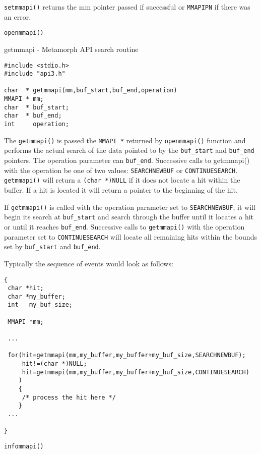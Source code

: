 \DIAGNOSTICS
\verb`setmmapi()` returns the mm pointer passed if successful or \verb`MMAPIPN` if
there was an error.

\SEE
\verb`openmmapi()`

\NAME
{getmmapi - Metamorph API search routine}

\SYNOPSIS
\begin{verbatim}
#include <stdio.h>
#include "api3.h"

char  * getmmapi(mm,buf_start,buf_end,operation)
MMAPI * mm;
char  * buf_start;
char  * buf_end;
int     operation;

\end{verbatim}

\DESCRIPTION

The \verb`getmmapi()` is passed the \verb`MMAPI *` returned by \verb`openmmapi()`
function and performs the actual search of the data pointed to by
the \verb`buf_start` and \verb`buf_end` pointers.  The operation parameter can
\verb`buf_end`.  Successive calls to getmmapi() with the operation
be one of two values:  \verb`SEARCHNEWBUF` or \verb`CONTINUESEARCH`. \verb`getmmapi()`
will return a \verb`(char *)NULL` if it does not locate a hit within the
buffer.  If a hit is located it will return a pointer to the
beginning of the hit.

If \verb`getmmapi()` is called with the operation parameter set to
\verb`SEARCHNEWBUF`, it will begin its search at \verb`buf_start` and search
through the buffer until it locates a hit or until it reaches
\verb`buf_end`.  Successive calls to \verb`getmmapi()` with the operation
parameter set to \verb`CONTINUESEARCH` will locate all remaining hits
within the bounds set by \verb`buf_start` and \verb`buf_end`.

Typically the sequence of events would look as follows:
\begin{verbatim}
{
 char *hit;
 char *my_buffer;
 int   my_buf_size;

 MMAPI *mm;

 ...

 for(hit=getmmapi(mm,my_buffer,my_buffer+my_buf_size,SEARCHNEWBUF);
     hit!=(char *)NULL;
     hit=getmmapi(mm,my_buffer,my_buffer+my_buf_size,CONTINUESEARCH)
    )
    {
     /* process the hit here */
    }
 ...

}

\end{verbatim}

\SEE
\begin{verbatim}
infommapi()
\end{verbatim}

